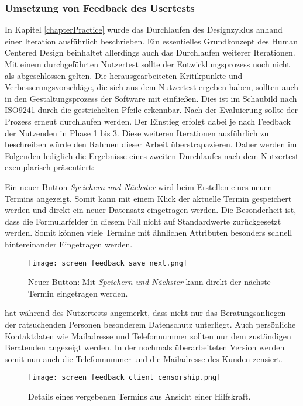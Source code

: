 \subsubsection{Umsetzung von Feedback des Usertests}
\label{paragraph:weitereIteration}

In Kapitel \ref{chapterPractice} wurde das Durchlaufen des Designzyklus anhand
einer Iteration ausführlich beschrieben. Ein essentielles Grundkonzept des
Human Centered Design beinhaltet allerdings auch das Durchlaufen weiterer
Iterationen. Mit einem durchgeführten Nutzertest sollte der Entwicklungsprozess
noch nicht als abgeschlossen gelten. Die herausgearbeiteten Kritikpunkte und
Verbesserungsvorschläge, die sich aus dem Nutzertest ergeben haben, sollten
auch in den Gestaltungsprozess der Software mit einfließen. Dies ist im
Schaubild nach ISO9241 durch die gestrichelten Pfeile erkennbar. Nach der
Evaluierung sollte der Prozess erneut durchlaufen werden. Der Einstieg erfolgt
dabei je nach Feedback der Nutzenden in Phase 1 bis 3\cite{iso9241}. Diese
weiteren Iterationen ausführlich zu beschreiben würde den Rahmen dieser Arbeit
überstrapazieren. Daher werden im Folgenden lediglich die Ergebnisse eines
zweiten Durchlaufes nach dem Nutzertest exemplarisch präsentiert:

Ein neuer Button \textit{Speichern und Nächster} wird beim Erstellen eines
neuen Termins angezeigt. Somit kann mit einem Klick der aktuelle Termin
gespeichert werden und direkt ein neuer Datensatz eingetragen werden. Die
Besonderheit ist, dass die Formularfelder in diesem Fall nicht auf
Standardwerte zurückgesetzt werden. Somit können viele Termine mit ähnlichen
Attributen besonders schnell hintereinander Eingetragen werden.

\begin{figure}[H]
    \caption{Neuer Button: Mit \textit{Speichern und Nächster} kann direkt der nächste Termin eingetragen werden.}
    \centering
    \texttt{[image: screen\_feedback\_save\_next.png]}
\end{figure}

\ipName hat während des Nutzertests angemerkt, dass nicht nur das Beratungsanliegen der ratsuchenden Personen besonderem Datenschutz unterliegt. Auch persönliche Kontaktdaten wie Mailadresse und Telefonnummer sollten nur dem zuständigen Beratenden angezeigt werden. In der nochmals überarbeiteten Version werden somit nun auch die Telefonnummer und die Mailadresse des Kunden zensiert.

\begin{figure}[H]
    \caption{Details eines vergebenen Termins aus Ansicht einer Hilfskraft.}
    \centering
    \texttt{[image: screen\_feedback\_client\_censorship.png]}
\end{figure}

